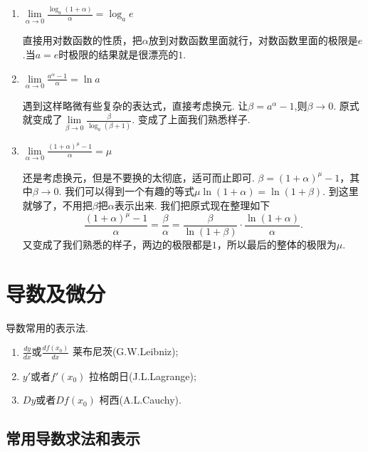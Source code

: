 \documentclass{article}
\begin{document}
\begin{enumerate}
	\item $\lim\limits_{\alpha \rightarrow 0} \frac{\log_a(1+\alpha)}{\alpha} = \log_a e$

直接用对数函数的性质，把$\alpha$放到对数函数里面就行，对数函数里面的极限是$e$.当$a=e$时极限的结果就是很漂亮的$1$.			
	
	\item $\lim\limits_{\alpha \rightarrow 0} \frac{a^\alpha-1}{\alpha} = \ln a$
	
遇到这样略微有些复杂的表达式，直接考虑换元. 让$\beta = a^\alpha -1$,则$\beta \rightarrow 0$. 原式就变成了$\lim\limits_{\beta \rightarrow 0} \frac{\beta}{\log_a(\beta+1)}$. 变成了上面我们熟悉样子.	
	
	\item $\lim\limits_{\alpha \rightarrow 0} \frac{(1+\alpha)^\mu-1}{\alpha} = \mu$
	
还是考虑换元，但是不要换的太彻底，适可而止即可. $\beta = (1+\alpha)^\mu - 1$，其中$\beta \rightarrow 0$. 我们可以得到一个有趣的等式$\mu \ln(1+\alpha) = \ln(1+\beta)$. 到这里就够了，不用把$\beta$把$\alpha$表示出来. 我们把原式现在整理如下\[\frac{(1+\alpha)^\mu-1}{\alpha} = \frac{\beta}{\alpha} = \frac{\beta}{\ln(1+\beta)}\cdot\frac{\ln(1+\alpha)}{\alpha}.\]又变成了我们熟悉的样子，两边的极限都是$1$，所以最后的整体的极限为$\mu$.	
\end{enumerate}

\newpage
\section{导数及微分}

导数常用的表示法.

\begin{enumerate}
	\item $\frac{dy}{dx}$或$\frac{df(x_0)}{dx}$ 莱布尼茨(G.W.Leibniz);
	\item $y'$或者$f'(x_0)$ 拉格朗日(J.L.Lagrange);
	\item $Dy$或者$Df(x_0)$ 柯西(A.L.Cauchy).
\end{enumerate}

\subsection{常用导数求法和表示}
\end{document}
